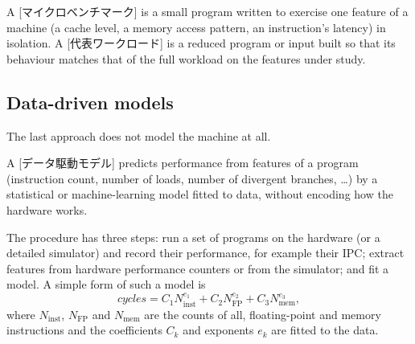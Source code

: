 \documentclass[../main.tex]{subfiles}
\begin{document}
\begin{definition}
  \label{def:l08-microbenchmark}
  A [マイクロベンチマーク] is a small program
  written to exercise one feature of a machine (a cache level, a
  memory access pattern, an instruction's latency) in isolation.  A
  [代表ワークロード] is a reduced program
  or input built so that its behaviour matches that of the full
  workload on the features under study.
\end{definition}

\subsection{Data-driven models}

The last approach does not model the machine at all.

\begin{definition}
  \label{def:l08-data-driven}
  A [データ駆動モデル] predicts performance
  from features of a program (instruction count, number of loads,
  number of divergent branches, \dots) by a statistical or
  machine-learning model fitted to data, without encoding how the
  hardware works.
\end{definition}

The procedure has three steps: run a set of programs on the hardware
(or a detailed simulator) and record their performance, for example
their IPC; extract features from hardware performance counters or from
the simulator; and fit a model.  A simple form of such a model is
\begin{equation}
  \textit{cycles} = C_1 N_{\text{inst}}^{e_1}
    + C_2 N_{\text{FP}}^{e_2} + C_3 N_{\text{mem}}^{e_3},
  \label{eq:l08-data-driven}
\end{equation}
where $N_{\text{inst}}$, $N_{\text{FP}}$ and $N_{\text{mem}}$ are the
counts of all, floating-point and memory instructions and the
coefficients $C_k$ and exponents $e_k$ are fitted to the
data.
\end{document}
